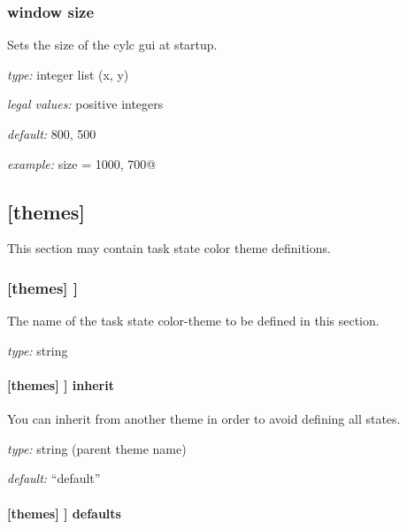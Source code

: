 \subsubsection{window size}

Sets the size of the cylc gui at startup.

\begin{myitemize}
    \item {\em type:} integer list (x, y)
\item {\em legal values:} positive integers
\item {\em default:} 800, 500
\item {\em example:} \lstinline@window size = 1000, 700@
\end{myitemize}

\subsection{[themes]}

This section may contain task state color theme definitions.

\subsubsection[{[}THEME{]}]{[themes] \textrightarrow [[THEME]]}

The name of the task state color-theme to be defined in this section.

\begin{myitemize}
\item {\em type:} string
\end{myitemize}

\paragraph[inherit]{[themes] \textrightarrow [[THEME]] \textrightarrow inherit}

You can inherit from another theme in order to avoid defining all states.

\begin{myitemize}
\item {\em type:} string (parent theme name)
\item {\em default:} ``default''
\end{myitemize}

\paragraph[defaults]{[themes] \textrightarrow [[THEME]] \textrightarrow defaults}

